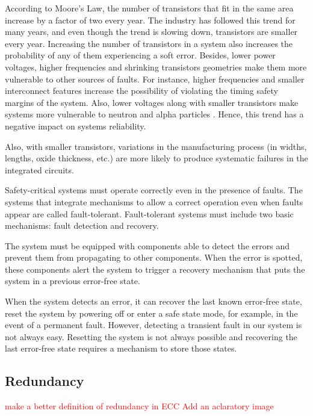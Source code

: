 According to Moore's Law, the number of transistors that fit in the same area increase by a factor of two every year. The industry has followed this trend for many years, and even though the trend is slowing down, transistors are smaller every year. Increasing the number of transistors in a system also increases the probability of any of them experiencing a soft error. Besides, lower power voltages, higher frequencies and shrinking transistors geometries make them more vulnerable to other sources of faults. For instance, higher frequencies and smaller interconnect features increase the possibility of violating the timing safety margins of the system. Also, lower voltages along with smaller transistors make systems more vulnerable to neutron and alpha particles \cite{constantinescu2003trends}. Hence, this trend has a negative impact on systems reliability. 

Also, with smaller transistors, variations in the manufacturing process (in widths, lengths, oxide thickness, etc.) are more likely to produce systematic failures in the integrated circuits. 

Safety-critical systems must operate correctly even in the presence of faults. The systems that integrate mechanisms to allow a correct operation even when faults appear are called fault-tolerant. Fault-tolerant systems must include two basic mechanisms: fault detection and recovery.

The system must be equipped with components able to detect the errors and prevent them from propagating to other components. When the error is spotted, these components alert the system to trigger a recovery mechanism that puts the system in a previous error-free state.

When the system detects an error, it can recover the last known error-free state, reset the system by powering off or enter a safe state mode, for example, in the event of a permanent fault. However, detecting a transient fault in our system is not always easy. Resetting the system is not always possible and recovering the last error-free state requires a mechanism to store those states. 

\bigskip



\subsection{Redundancy}

\textcolor{red}{make a better definition of redundancy in ECC}
\textcolor{red}{Add an aclaratory image}


